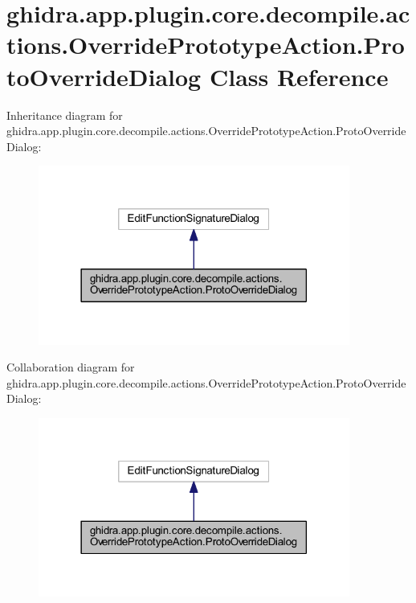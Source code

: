 \hypertarget{classghidra_1_1app_1_1plugin_1_1core_1_1decompile_1_1actions_1_1_override_prototype_action_1_1_proto_override_dialog}{}\section{ghidra.\+app.\+plugin.\+core.\+decompile.\+actions.\+Override\+Prototype\+Action.\+Proto\+Override\+Dialog Class Reference}
\label{classghidra_1_1app_1_1plugin_1_1core_1_1decompile_1_1actions_1_1_override_prototype_action_1_1_proto_override_dialog}


Inheritance diagram for ghidra.\+app.\+plugin.\+core.\+decompile.\+actions.\+Override\+Prototype\+Action.\+Proto\+Override\+Dialog\+:
\nopagebreak
\begin{figure}[H]
\begin{center}
\leavevmode
\includegraphics[width=290pt]{classghidra_1_1app_1_1plugin_1_1core_1_1decompile_1_1actions_1_1_override_prototype_action_1_1_pdcc4154acabb0b10c38fd6a1e7e96940}
\end{center}
\end{figure}


Collaboration diagram for ghidra.\+app.\+plugin.\+core.\+decompile.\+actions.\+Override\+Prototype\+Action.\+Proto\+Override\+Dialog\+:
\nopagebreak
\begin{figure}[H]
\begin{center}
\leavevmode
\includegraphics[width=290pt]{classghidra_1_1app_1_1plugin_1_1core_1_1decompile_1_1actions_1_1_override_prototype_action_1_1_pc14c00b7b4d58d59755a60eb3df9f1ca}
\end{center}
\end{figure}
